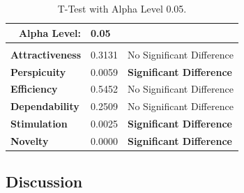 \begin{table}[]
\centering
\begin{tabular}{|l|l|l|}
\hline
\multicolumn{1}{|r|}{Alpha Level:} & 0.05   &                                                         \\ \hline
                                   &        &                                                         \\ \hline
\textbf{Attractiveness}            & 0.3131 & No Significant Difference       \\ \hline
\textbf{Perspicuity}               & 0.0059 & \textbf{Significant Difference} \\ \hline
\textbf{Efficiency}                & 0.5452 & No Significant Difference       \\ \hline
\textbf{Dependability}             & 0.2509 & No Significant Difference       \\ \hline
\textbf{Stimulation}               & 0.0025 & \textbf{Significant Difference} \\ \hline
\textbf{Novelty}                   & 0.0000 & \textbf{Significant Difference} \\ \hline
\end{tabular}
\caption{T-Test with Alpha Level 0.05.}
\label{table:table53}
\end{table} 

\subsection{Discussion}